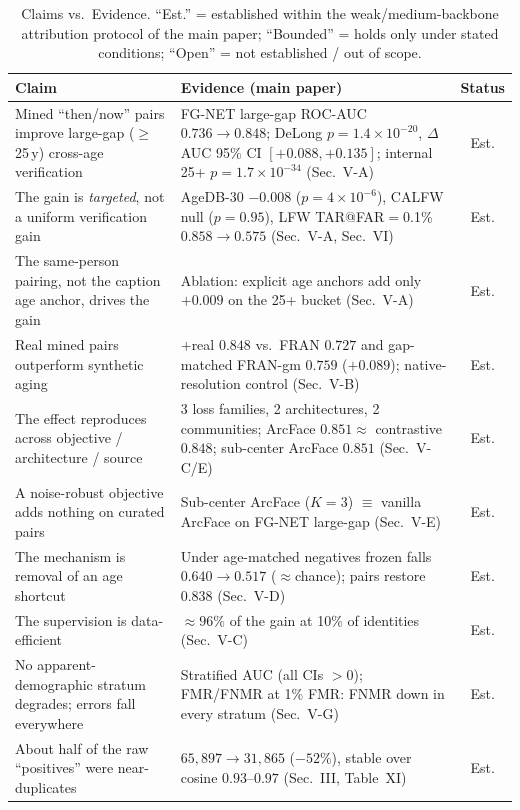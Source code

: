\documentclass[journal]{IEEEtran}
\begin{document}
\begin{table}[!t]
\renewcommand{\arraystretch}{1.25}
\caption{Claims vs.\ Evidence. ``Est.'' = established within the weak/medium-backbone attribution
protocol of the main paper; ``Bounded'' = holds only under stated conditions; ``Open'' = not
established / out of scope.}
\label{tab:claims}
\centering
\footnotesize
\begin{tabular}{@{}p{}p{}c@{}}
\toprule
Claim & Evidence (main paper) & Status \\
\midrule
Mined ``then/now'' pairs improve large-gap ($\geq$25\,y) cross-age verification &
FG-NET large-gap ROC-AUC $0.736\!\to\!0.848$; DeLong $p{=}1.4{\times}10^{-20}$, $\Delta$AUC 95\% CI $[{+}0.088,{+}0.135]$; internal 25+ $p{=}1.7{\times}10^{-34}$ (Sec.~V-A) & Est. \\
The gain is \emph{targeted}, not a uniform verification gain &
AgeDB-30 $-0.008$ ($p{=}4{\times}10^{-6}$), CALFW null ($p{=}0.95$), LFW TAR@FAR$=$0.1\% $0.858\!\to\!0.575$ (Sec.~V-A, Sec.~VI) & Est. \\
The same-person pairing, not the caption age anchor, drives the gain &
Ablation: explicit age anchors add only $+0.009$ on the 25+ bucket (Sec.~V-A) & Est. \\
Real mined pairs outperform synthetic aging &
$+$real $0.848$ vs.\ FRAN $0.727$ and gap-matched FRAN-gm $0.759$ ($+0.089$); native-resolution control (Sec.~V-B) & Est. \\
The effect reproduces across objective / architecture / source &
3 loss families, 2 architectures, 2 communities; ArcFace $0.851\approx$ contrastive $0.848$; sub-center ArcFace $0.851$ (Sec.~V-C/E) & Est. \\
A noise-robust objective adds nothing on curated pairs &
Sub-center ArcFace ($K{=}3$) $\equiv$ vanilla ArcFace on FG-NET large-gap (Sec.~V-E) & Est. \\
The mechanism is removal of an age shortcut &
Under age-matched negatives frozen falls $0.640\!\to\!0.517$ ($\approx$chance); pairs restore $0.838$ (Sec.~V-D) & Est. \\
The supervision is data-efficient &
${\approx}96\%$ of the gain at 10\% of identities (Sec.~V-C) & Est. \\
No apparent-demographic stratum degrades; errors fall everywhere &
Stratified AUC (all CIs $>0$); FMR/FNMR at 1\% FMR: FNMR down in every stratum (Sec.~V-G) & Est. \\
About half of the raw ``positives'' were near-duplicates &
$65{,}897\!\to\!31{,}865$ ($-52\%$), stable over cosine $0.93$--$0.97$ (Sec.~III, Table~XI) & Est. \\

\end{tabular}
\end{table}
\end{document}
